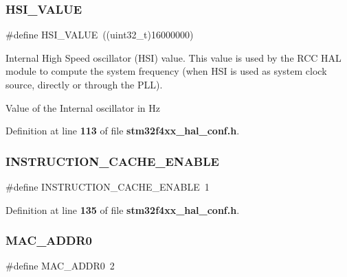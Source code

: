\subsubsection{H\+S\+I\+\_\+\+V\+A\+L\+UE}
{\footnotesize\ttfamily \#define H\+S\+I\+\_\+\+V\+A\+L\+UE~((uint32\+\_\+t)16000000)}



Internal High Speed oscillator (H\+SI) value. This value is used by the R\+CC H\+AL module to compute the system frequency (when H\+SI is used as system clock source, directly or through the P\+LL). 

Value of the Internal oscillator in Hz 

Definition at line \textbf{ 113} of file \textbf{ stm32f4xx\+\_\+hal\+\_\+conf.\+h}.

\mbox{\label{stm32f4xx__hal__conf_8h_a3379989d46599c7e19a43f42e9145a4a}} 
\subsubsection{I\+N\+S\+T\+R\+U\+C\+T\+I\+O\+N\+\_\+\+C\+A\+C\+H\+E\+\_\+\+E\+N\+A\+B\+LE}
{\footnotesize\ttfamily \#define I\+N\+S\+T\+R\+U\+C\+T\+I\+O\+N\+\_\+\+C\+A\+C\+H\+E\+\_\+\+E\+N\+A\+B\+LE~1}



Definition at line \textbf{ 135} of file \textbf{ stm32f4xx\+\_\+hal\+\_\+conf.\+h}.

\mbox{\label{stm32f4xx__hal__conf_8h_ab84a2e15d360e2644ada09641513a941}} 
\subsubsection{M\+A\+C\+\_\+\+A\+D\+D\+R0}
{\footnotesize\ttfamily \#define M\+A\+C\+\_\+\+A\+D\+D\+R0~2}



